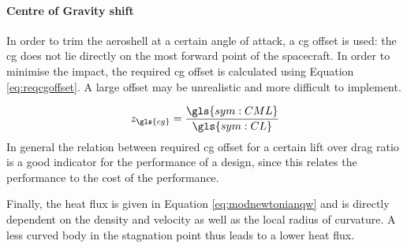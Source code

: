 \paragraph{Centre of Gravity shift}
In order to trim the aeroshell at a certain angle of attack, a \gls{cg} offset is used: the \gls{cg} does not lie directly on the most forward point of the spacecraft. In order to minimise the impact, the required \gls{cg} offset is calculated using Equation \ref{eq:reqcgoffset}. A large offset may be unrealistic and more difficult to implement.

\begin{equation} \label{eq:reqcgoffset}
z_{\gls{cg}} = \frac{\gls{sym:CML}}{\gls{sym:CL}}
\end{equation}
In general the relation between required \gls{cg} offset for a certain lift over drag ratio is a good indicator for the performance of a design, since this relates the performance to the cost of the performance.

Finally, the heat flux is given in Equation \ref{eq:modnewtonianqw} and is directly dependent on the density and velocity as well as the local radius of curvature. A less curved body in the stagnation point thus leads to a lower heat flux.


